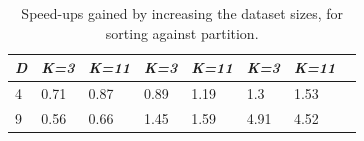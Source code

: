 \begin{table}[H]
\centering
\begin{tabular}{@{} *8l @{}}    \toprule
\emph{D} & \emph{K=3} & \emph{K=11} & \emph{K=3} & \emph{K=11} & \emph{K=3} & \emph{K=11} &  \\\midrule
  4  & 0.71 & 0.87 & 0.89 & 1.19 & 1.3 &1.53  &   \\ 
  9  & 0.56 & 0.66 & 1.45 & 1.59 & 4.91 & 4.52  &   \\\bottomrule 
 \hline
\end{tabular}
\caption{Speed-ups gained by increasing the dataset sizes, for sorting against partition.}
\label{tab:sort}
\end{table}
 








